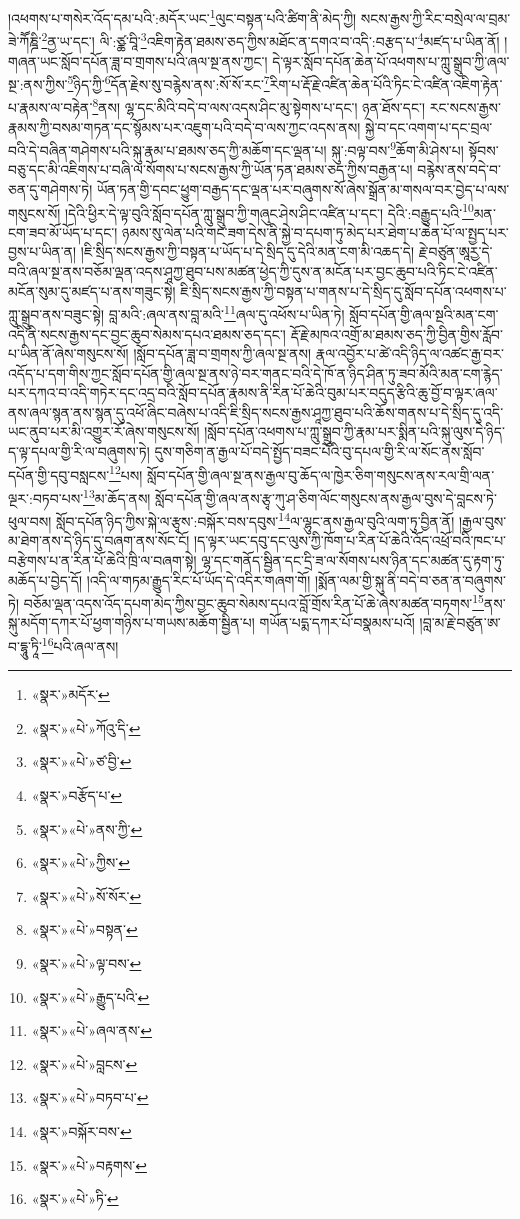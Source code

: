 །འཕགས་པ་གསེར་འོད་དམ་པའི་:མདོར་ཡང་\footnote{«སྣར་»མདོར་}ལུང་བསྟན་པའི་ཚིག་ནི་མེད་ཀྱི། སངས་རྒྱས་ཀྱི་རིང་བསྲེལ་ལ་བྲམ་ཟེ་ཀཽཎྜི་\footnote{«སྣར་»«པེ་»ཀོའུ་དི་}ནྱ་ཡ་དང་། ལི་:ཙྪ་བཱི་\footnote{«སྣར་»«པེ་»ཙ་བྱི་}འཇིག་རྟེན་ཐམས་ཅད་ཀྱིས་མཐོང་ན་དགའ་བ་འདི་:བརྩད་པ་\footnote{«སྣར་»བརྩོད་པ་}མཛད་པ་ཡིན་ནོ། །གཞན་ཡང་སློབ་དཔོན་ཟླ་བ་གྲགས་པའི་ཞལ་སྔ་ནས་ཀྱང་། དེ་ལྟར་སློབ་དཔོན་ཆེན་པོ་འཕགས་པ་ཀླུ་སྒྲུབ་ཀྱི་ཞལ་སྔ་:ནས་ཀྱིས་\footnote{«སྣར་»«པེ་»ནས་ཀྱི་}ཉིད་ཀྱི་\footnote{«སྣར་»«པེ་»ཀྱིས་}དོན་རྗེས་སུ་བརྙེས་ནས་:སོ་སོ་རང་\footnote{«སྣར་»«པེ་»སོ་སོར་}རིག་པ་རྡོ་རྗེ་འཛིན་ཆེན་པོའི་ཏིང་ངེ་འཛིན་འཇིག་རྟེན་པ་རྣམས་ལ་བརྟེན་\footnote{«སྣར་»«པེ་»བསྟན་}ནས། ལྷ་དང་མིའི་བདེ་བ་ལས་འདས་ཤིང་མུ་སྟེགས་པ་དང་། ཉན་ཐོས་དང་། རང་སངས་རྒྱས་རྣམས་ཀྱི་བསམ་གཏན་དང་སྙོམས་པར་འཇུག་པའི་བདེ་བ་ལས་ཀྱང་འདས་ནས། སྐྱེ་བ་དང་འགག་པ་དང་བྲལ་བའི་དེ་བཞིན་གཤེགས་པའི་སྐུ་རྣམ་པ་ཐམས་ཅད་ཀྱི་མཆོག་དང་ལྡན་པ། སྐུ་:བལྟ་བས་\footnote{«སྣར་»«པེ་»ལྟ་བས་}ཆོག་མི་ཤེས་པ། སྟོབས་བཅུ་དང་མི་འཇིགས་པ་བཞི་ལ་སོགས་པ་སངས་རྒྱས་ཀྱི་ཡོན་ཏན་ཐམས་ཅད་ཀྱིས་བརྒྱན་པ། བརྙེས་ནས་བདེ་བ་ཅན་དུ་གཤེགས་ཏེ། ཡོན་ཏན་གྱི་དབང་ཕྱུག་བརྒྱད་དང་ལྡན་པར་བཞུགས་སོ་ཞེས་སྒྲོན་མ་གསལ་བར་བྱེད་པ་ལས་གསུངས་སོ། །དེའི་ཕྱིར་དེ་ལྟ་བུའི་སློབ་དཔོན་ཀླུ་སྒྲུབ་ཀྱི་གཞུང་ཤེས་ཤིང་འཛིན་པ་དང་། དེའི་:བརྒྱུད་པའི་\footnote{«སྣར་»«པེ་»རྒྱུད་པའི་}མན་ངག་ཟབ་མོ་ཡོད་པ་དང་། ཉམས་སུ་ལེན་པའི་གང་ཟག་དེས་ནི་སྐྱེ་བ་དཔག་ཏུ་མེད་པར་ཐེག་པ་ཆེན་པོ་ལ་སྤྱད་པར་བྱས་པ་ཡིན་ན། །ཇི་སྲིད་སངས་རྒྱས་ཀྱི་བསྟན་པ་ཡོད་པ་དེ་སྲིད་དུ་དེའི་མན་ངག་མི་འཆད་དེ། རྗེ་བཙུན་ཨཱརྱ་དེ་བའི་ཞལ་སྔ་ནས་བཅོམ་ལྡན་འདས་ཤཱཀྱ་ཐུབ་པས་མཚན་ཕྱེད་ཀྱི་དུས་ན་མངོན་པར་བྱང་ཆུབ་པའི་ཏིང་ངེ་འཛིན་མངོན་སུམ་དུ་མཛད་པ་ནས་གཟུང་སྟེ། ཇི་སྲིད་སངས་རྒྱས་ཀྱི་བསྟན་པ་གནས་པ་དེ་སྲིད་དུ་སློབ་དཔོན་འཕགས་པ་ཀླུ་སྒྲུབ་ནས་བཟུང་སྟེ། བླ་མའི་:ཞལ་ནས་བླ་མའི་\footnote{«སྣར་»«པེ་»ཞལ་ནས་}ཞལ་དུ་འཕོས་པ་ཡིན་ཏེ། སློབ་དཔོན་གྱི་ཞལ་སྔའི་མན་ངག་འདི་ནི་སངས་རྒྱས་དང་བྱང་ཆུབ་སེམས་དཔའ་ཐམས་ཅད་དང་། རྡོ་རྗེ་མཁའ་འགྲོ་མ་ཐམས་ཅད་ཀྱི་བྱིན་གྱིས་རློབ་པ་ཡིན་ནོ་ཞེས་གསུངས་སོ། །སློབ་དཔོན་ཟླ་བ་གྲགས་ཀྱི་ཞལ་སྔ་ནས། རྣལ་འབྱོར་པ་ཚེ་འདི་ཉིད་ལ་འཚང་རྒྱ་བར་འདོད་པ་དག་གིས་ཀྱང་སློབ་དཔོན་གྱི་ཞལ་སྔ་ནས་ཉེ་བར་གནང་བའི་དེ་ཁོ་ན་ཉིད་ཤིན་ཏུ་ཟབ་མོའི་མན་ངག་རྙེད་པར་དཀའ་བ་འདི་གཏེར་དང་འདྲ་བའི་སློབ་དཔོན་རྣམས་ནི་རིན་པོ་ཆེའི་བུམ་པར་བདུད་རྩིའི་ཆུ་བྱོ་བ་ལྟར་ཞལ་ནས་ཞལ་སྙན་ནས་སྙན་དུ་འཕོ་ཞིང་བཞེས་པ་འདི་ཇི་སྲིད་སངས་རྒྱས་ཤཱཀྱ་ཐུབ་པའི་ཆོས་གནས་པ་དེ་སྲིད་དུ་འདི་ཡང་ནུབ་པར་མི་འགྱུར་རོ་ཞེས་གསུངས་སོ། །སློབ་དཔོན་འཕགས་པ་ཀླུ་སྒྲུབ་ཀྱི་རྣམ་པར་སྨིན་པའི་སྐུ་ལུས་དེ་ཉིད་ད་ལྟ་དཔལ་གྱི་རི་ལ་བཞུགས་ཏེ། དུས་གཅིག་ན་རྒྱལ་པོ་བདེ་སྤྱོད་བཟང་པོའི་བུ་དཔལ་གྱི་རི་ལ་སོང་ནས་སློབ་དཔོན་གྱི་དབུ་བསླངས་\footnote{«སྣར་»«པེ་»བླངས་}པས། སློབ་དཔོན་གྱི་ཞལ་སྔ་ནས་རྒྱལ་བུ་ཆོད་ལ་ཁྱེར་ཅིག་གསུངས་ནས་རལ་གྲི་ལན་ལྔར་:བཏབ་པས་\footnote{«སྣར་»«པེ་»བཏབ་པ་}མ་ཆོད་ནས། སློབ་དཔོན་གྱི་ཞལ་ནས་རྩྭ་ཀུ་ཤ་ཅིག་ལོང་གསུངས་ནས་རྒྱལ་བུས་དེ་བླངས་ཏེ་ཕུལ་བས། སློབ་དཔོན་ཉིད་ཀྱིས་སྐེ་ལ་རྩྭས་:བསྐོར་བས་དབུས་\footnote{«སྣར་»བསྐོར་བས་}ལ་ལྷུང་ནས་རྒྱལ་བུའི་ལག་ཏུ་བྱིན་ནོ། །རྒྱལ་བུས་མ་ཐེག་ནས་དེ་ཉིད་དུ་བཞག་ནས་སོང་ངོ། །ད་ལྟར་ཡང་དབུ་དང་ལུས་ཀྱི་ཁོག་པ་རིན་པོ་ཆེའི་འོད་འཕྲོ་བའི་ཁང་པ་བརྩེགས་པ་ན་རིན་པོ་ཆེའི་ཁྲི་ལ་བཞག་སྟེ། ལྷ་དང་གནོད་སྦྱིན་དང་དྲི་ཟ་ལ་སོགས་པས་ཉིན་དང་མཚན་དུ་རྟག་ཏུ་མཆོད་པ་བྱེད་དོ། །འདི་ལ་གཏམ་རྒྱུད་རིང་པོ་ཡོད་དེ་འདིར་གཞག་གོ། །སྨོན་ལམ་གྱི་སྐུ་ནི་བདེ་བ་ཅན་ན་བཞུགས་ཏེ། བཅོམ་ལྡན་འདས་འོད་དཔག་མེད་ཀྱིས་བྱང་ཆུབ་སེམས་དཔའ་བློ་གྲོས་རིན་པོ་ཆེ་ཞེས་མཚན་བཏགས་\footnote{«སྣར་»«པེ་»བརྟགས་}ནས་སྐུ་མདོག་དཀར་པོ་ཕྱག་གཉིས་པ་གཡས་མཆོག་སྦྱིན་པ། གཡོན་པདྨ་དཀར་པོ་བསྣམས་པའོ། །བླ་མ་རྗེ་བཙུན་ཨ་བ་དྷཱུ་ཏཱི་\footnote{«སྣར་»«པེ་»ཏི་}པའི་ཞལ་ནས། 